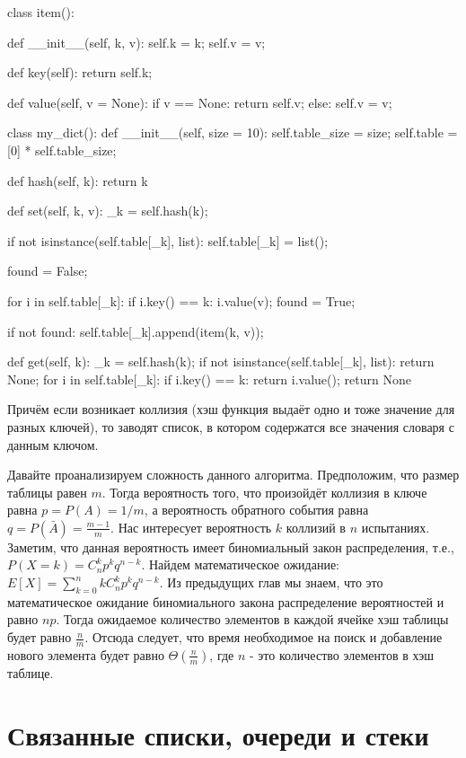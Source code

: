 \begin{python}
class item():

	def __init__(self, k, v):
		self.k = k;
		self.v = v;

	def key(self):
		return self.k;

	def value(self, v = None):
		if v == None:
			return self.v;
		else:
			self.v = v;

class my_dict():
	def __init__(self, size = 10):
		self.table_size = size;
		self.table = [0] * self.table_size;

	def hash(self, k):
		return k %

	def set(self, k, v):
		_k = self.hash(k);

		if not isinstance(self.table[_k], list):
			self.table[_k] = list();

		found = False;

		for i in self.table[_k]:
			if i.key() == k:
				i.value(v);	
				found = True;

		if not found:
			self.table[_k].append(item(k, v));


	def get(self, k):
		_k = self.hash(k);
		if not isinstance(self.table[_k], list):
			return None;
		for i in self.table[_k]:
			if i.key() == k:
				return i.value();
		return None
\end{python}

Причём если возникает коллизия (хэш функция выдаёт одно и тоже значение для разных 
ключей), то заводят список, в котором содержатся все значения словаря с данным ключом.

Давайте проанализируем сложность данного алгоритма. Предположим, что 
размер таблицы равен $m$. Тогда вероятность того, что произойдёт коллизия в 
ключе равна $p=P(A)=1/m$, а вероятность обратного события равна $q=P(\bar{A})=\frac{m-1}{m}$.
Нас интересует вероятность $k$ коллизий в $n$ испытаниях. Заметим, что данная вероятность 
имеет биномиальный закон распределения, т.е., $P(X=k) = C_n^kp^kq^{n-k}$. 
Найдем математическое ожидание: $E[X]=\sum_{k=0}^nkC_n^kp^kq^{n-k}$. Из 
предыдущих глав мы знаем, что это математическое ожидание биномиального
закона распределение вероятностей и равно $np$.
Тогда ожидаемое количество элементов в каждой ячейке хэш таблицы будет 
равно $\frac{n}{m}$. Отсюда следует, что время необходимое на поиск 
и добавление нового элемента будет равно $\Theta(\frac{n}{m})$,
где $n$ - это количество элементов в хэш таблице.

\section{Связанные списки, очереди и стеки}

